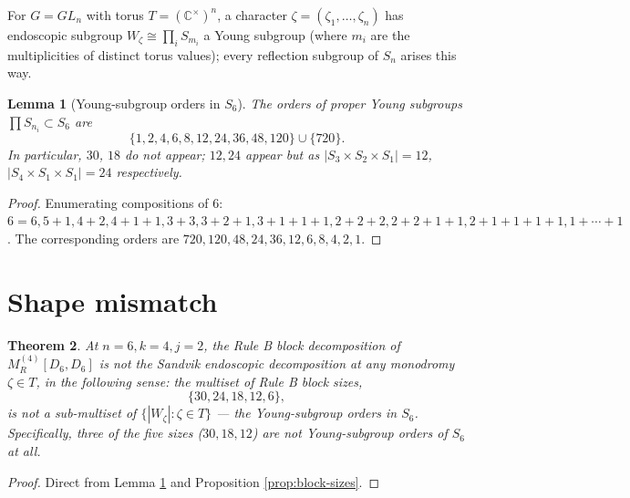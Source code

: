 \documentclass[11pt]{article}
\newtheorem{theorem}{Theorem}
\newtheorem{lemma}[theorem]{Lemma}
\theoremstyle{definition}
\begin{document}
For $G = GL_n$ with torus $T = (\mathbb{C}^\times)^n$, a character
$\zeta = (\zeta_1, \ldots, \zeta_n)$ has endoscopic subgroup $W_\zeta \cong \prod_i S_{m_i}$
a Young subgroup (where $m_i$ are the multiplicities of distinct torus values);
every reflection subgroup of $S_n$ arises this way.

\begin{lemma}[Young-subgroup orders in $S_6$]\label{lem:young}
The orders of proper Young subgroups $\prod S_{n_i} \subset S_6$ are
$$\{1, 2, 4, 6, 8, 12, 24, 36, 48, 120\} \cup \{720\}.$$
In particular, $30$, $18$ do not appear; $12, 24$ appear but as $|S_3 \times S_2 \times S_1| = 12$,
$|S_4 \times S_1 \times S_1| = 24$ respectively.
\end{lemma}

\begin{proof}
Enumerating compositions of $6$: $6 = 6, 5+1, 4+2, 4+1+1, 3+3, 3+2+1, 3+1+1+1, 2+2+2, 2+2+1+1, 2+1+1+1+1, 1+\cdots+1$. The corresponding orders are
$720, 120, 48, 24, 36, 12, 6, 8, 4, 2, 1$.
\end{proof}

\section{Shape mismatch}

\begin{theorem}\label{thm:mismatch}
At $n=6, k=4, j=2$, the Rule B block decomposition of $M_R^{(4)}[D_6, D_6]$ is
\emph{not} the Sandvik endoscopic decomposition at any monodromy $\zeta \in T$, in the
following sense: the multiset of Rule B block sizes,
$$\{30, 24, 18, 12, 6\},$$
is not a sub-multiset of $\{|W_\zeta| : \zeta \in T\}$ — the Young-subgroup orders in
$S_6$. Specifically, three of the five sizes ($30, 18, 12$) are not Young-subgroup
orders of $S_6$ at all.
\end{theorem}

\begin{proof}
Direct from Lemma \ref{lem:young} and Proposition \ref{prop:block-sizes}.
\end{proof}
\end{document}
